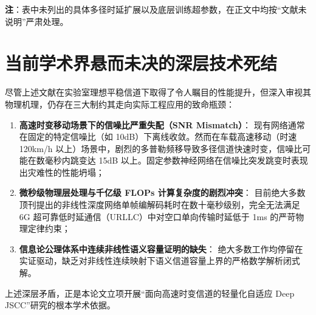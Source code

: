 \begin{table}[htbp]
  \centering
  \small
  \caption{面向 6G 语义通信的核心代表性文献属性与性能系统对比表}
  \label{tab:lit_comparison_full}
  \vspace{0.15cm}\par
  \noindent\footnotesize{
    \textbf{注}：表中未列出的具体多径时延扩展以及底层训练超参数，在正文中均按“文献未说明”严肃处理。
  }
\end{table}

\section{当前学术界悬而未决的深层技术死结}
尽管上述文献在实验室理想平稳信道下取得了令人瞩目的性能提升，但深入审视其物理机理，仍存在三大制约其走向实际工程应用的致命瓶颈：
\begin{enumerate}
  \item \textbf{高速时变移动场景下的信噪比严重失配（SNR Mismatch）}：
  现有网络通常在固定的特定信噪比（如 10dB）下离线收敛。然而在车载高速移动（时速 120km/h 以上）场景中，剧烈的多普勒频移导致多径信道快速时变，信噪比可能在数毫秒内跳变达 15dB 以上。固定参数神经网络在信噪比突发跳变时表现出灾难性的性能坍塌；
  \item \textbf{微秒级物理层处理与千亿级 FLOPs 计算复杂度的剧烈冲突}：
  目前绝大多数顶刊提出的非线性深度网络单帧编解码耗时在数十毫秒级别，完全无法满足 6G 超可靠低时延通信（URLLC）中对空口单向传输时延低于 1ms 的严苛物理定律约束；
  \item \textbf{信息论公理体系中连续非线性语义容量证明的缺失}：
  绝大多数工作均停留在实证驱动，缺乏对非线性连续映射下语义信道容量上界的严格数学解析闭式解。
\end{enumerate}

上述深层矛盾，正是本论文立项开展“面向高速时变信道的轻量化自适应 Deep JSCC”研究的根本学术依据。
